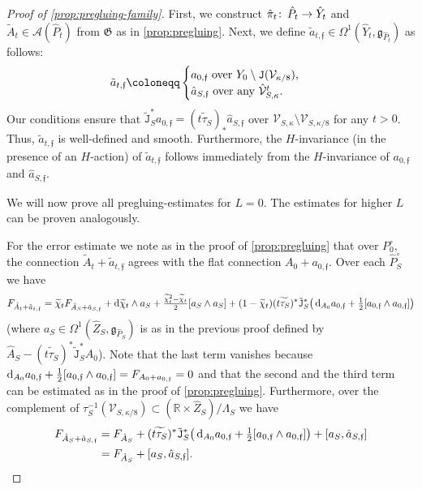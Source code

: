 \documentclass[11pt,a4paper]{scrartcl}
\newcommand*\diff{\mathop{}\!\textup{d}}
\newcommand{\col}{\colon \thinspace}
\numberwithin{equation}{section}
\theoremstyle{plain}
\theoremstyle{definition}
\theoremstyle{remark}
\begin{document}
\begin{proof}[Proof of \autoref{prop:pregluing-family}]
First, we construct $\hat{\pi}_t \col \hat{P}_t \to \hat{Y}_t$ and $\tilde{A}_t \in \mathcal{A}(\hat{P}_t)$ from $\mathfrak{G}$ as in \autoref{prop:pregluing}. Next, we define $\tilde{a}_{t,\mathfrak{f}} \in \Omega^1(\hat{Y}_t,\mathfrak{g}_{\hat{P}_t})$ as follows:
\begin{align*}
\tilde{a}_{t,\mathfrak{f}} \coloneqq \begin{cases}
a_{0,\mathfrak{f}} \textup{ over $Y_0\setminus \mathtt{J}(\mathcal{V}_{\kappa/8})$,} \\
\hat{a}_{S,\mathfrak{f}} \textup{ over any $\hat{\mathcal{V}}_{S,\kappa}^t$.}
\end{cases}
\end{align*}
Our conditions ensure that $\tilde{\mathtt{J}}^*_Sa_{0,\mathfrak{f}}  =  (\widetilde{t\tau_S})_*\hat{a}_{S,\mathfrak{f}}$ over $\mathcal{V}_{S,\kappa}\setminus\mathcal{V}_{S,\kappa/8}$ for any $t>0$. Thus, $\tilde{a}_{t,\mathfrak{f}}$ is well-defined and smooth. Furthermore, the $H$-invariance (in the presence of an $H$-action) of $\tilde{a}_{t,\mathfrak{f}}$ follows immediately from the $H$-invariance of $a_{0,\mathfrak{f}}$ and $\hat{a}_{S,\mathfrak{f}}$.

We will now prove all pregluing-estimates for $L=0$. The estimates for higher $L$ can be proven analogously.

For the error estimate we note as in the proof of \autoref{prop:pregluing} that over $P_0^\circ$, the connection $\tilde{A}_t + \tilde{a}_{t,\mathfrak{f}}$ agrees with the flat connection $A_{0}+a_{0,\mathfrak{f}}$. Over each $\hat{P}_S^\circ$ we have \[F_{\tilde{A}_t+\tilde{a}_{t,\mathfrak{f}}} = \widetilde{\chi}_t F_{\hat{A}_S+\hat{a}_{S,\mathfrak{f}}} + \diff \widetilde{\chi}_t \wedge a_S + \tfrac{\widetilde{\chi}_t^2-\widetilde{\chi}_t}{2} [a_S\wedge a_S]+ (1-\widetilde{\chi}_t)(\widetilde{t\tau_S})^*\tilde{\mathtt{J}}_S^*\big(\diff_{A_0}a_{0,\mathfrak{f}} + \tfrac{1}{2}[a_{0,\mathfrak{f}} \wedge a_{0,\mathfrak{f}}]\big) \] (where $a_S\in \Omega^1(\hat{Z}_S,\mathfrak{g}_{\hat{P}_S})$ is as in the previous proof defined by $\hat{A}_S-(\widetilde{t\tau_S})^*\tilde{\mathtt{J}}_S^*A_0$). Note that the last term vanishes because $\diff_{A_0}a_{0,\mathfrak{f}} + \tfrac{1}{2}[a_{0,\mathfrak{f}}\wedge a_{0,\mathfrak{f}}] = F_{A_0+a_{0,\mathfrak{f}}} = 0$ and that the second and the third term can be estimated as in the proof of \autoref{prop:pregluing}. Furthermore, over the complement of $\tau_S^{-1}(\mathcal{V}_{S,\kappa/8}) \subset (\mathbb{R}\times \hat{Z}_S)/\Lambda_S$ we have
\begin{align}
F_{\hat{A}_S+\hat{a}_{S,\mathfrak{f}}} &= F_{\hat{A}_S} + (\widetilde{t\tau_S})^*\tilde{\mathtt{J}}_S^*\big(\diff_{A_0}a_{0,\mathfrak{f}} + \tfrac{1}{2}[a_{0,\mathfrak{f}} \wedge a_{0,\mathfrak{f}}]\big) + [a_S,\hat{a}_{S,\mathfrak{f}}] \notag\\
&= F_{\hat{A}_S} + [a_S,\hat{a}_{S,\mathfrak{f}}]. \label{equ: pregluing family curvature outside compactum}
\end{align}


\end{proof}
\end{document}
